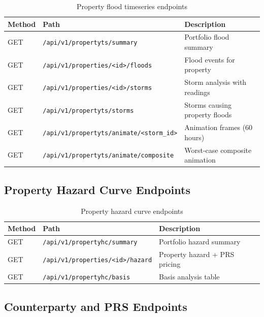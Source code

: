 \documentclass[11pt,a4paper]{article}
\begin{document}
\begin{table}[H]
    \centering
    \caption{Property flood timeseries endpoints}
    \begin{tabular}{@{}lll@{}}
        \toprule
        \textbf{Method} & \textbf{Path} & \textbf{Description} \\
        \midrule
        GET & \texttt{/api/v1/propertyts/summary}             & Portfolio flood summary \\
        GET & \texttt{/api/v1/properties/<id>/floods}          & Flood events for property \\
        GET & \texttt{/api/v1/properties/<id>/storms}          & Storm analysis with readings \\
        GET & \texttt{/api/v1/propertyts/storms}               & Storms causing property floods \\
        GET & \texttt{/api/v1/propertyts/animate/<storm\_id>}  & Animation frames (60 hours) \\
        GET & \texttt{/api/v1/propertyts/animate/composite}    & Worst-case composite animation \\
        \bottomrule
    \end{tabular}
\end{table}

\subsection{Property Hazard Curve Endpoints}

\begin{table}[H]
    \centering
    \caption{Property hazard curve endpoints}
    \begin{tabular}{@{}lll@{}}
        \toprule
        \textbf{Method} & \textbf{Path} & \textbf{Description} \\
        \midrule
        GET & \texttt{/api/v1/propertyhc/summary}              & Portfolio hazard summary \\
        GET & \texttt{/api/v1/properties/<id>/hazard}           & Property hazard + PRS pricing \\
        GET & \texttt{/api/v1/propertyhc/basis}                 & Basis analysis table \\
        \bottomrule
    \end{tabular}
\end{table}

\subsection{Counterparty and PRS Endpoints}
\end{document}
